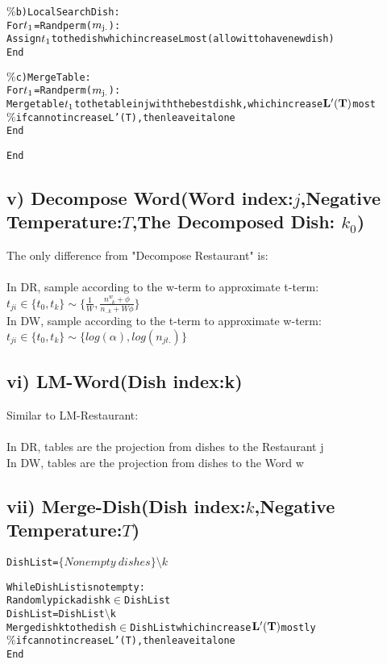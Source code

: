 \documentclass{article}
\begin{document}
\begin{spacing}{1.1}
\begin{alltt}
      \(\%\)b)Local Search Dish:
        For \(t\textsubscript{1}\)=Randperm(\(m\textsubscript{j.}\)):
            Assign \(t\textsubscript{1}\) to the dish which increase L most(allow it to have new dish)
        End
              
      \(\%\)c)Merge Table:
        For \(t\textsubscript{1}\)=Randperm(\(m\textsubscript{j.}\)):
            Merge table \(t\textsubscript{1}\) to the table in j with the best dish k, which increase \({\bf L'(T)}\) most
            \(\%\)if cannot increase L'(T),then leave it alone
        End

End
\end{alltt}
\subsection{v) Decompose Word(Word index:$j$,Negative Temperature:$T$,The Decomposed Dish: $k_{0}$)}
The only difference from "Decompose Restaurant" is:\\ \\
In DR, sample according to the w-term to approximate t-term:$t_{ji}\in\{t_{0},t_{k}\}\sim\{\frac{1}{W},\frac{n_{..k}^{w}+\phi}{n_{..k}+W\phi}\}$\\
In DW, sample according to the t-term to approximate w-term:$t_{ji}\in\{t_{0},t_{k}\}\sim\{log(\alpha),log(n_{jt.})\}$

\subsection{vi) LM-Word(Dish index:k)}
Similar to LM-Restaurant:\\\\
In DR, tables are the projection from dishes to the Restaurant j\\
In DW, tables are the projection from dishes to the Word w\\
\subsection{vii) Merge-Dish(Dish index:$k$,Negative Temperature:$T$)}
\begin{alltt}
Dish List=\(\{Nonempty \ dishes\}\setminus k\)
 
While Dish List is not empty:
    Randomly pick a dish k\(\in\) Dish List
    Dish List=Dish List\(\setminus\)k
    Merge dish k to the dish\(\in\) Dish List which increase \({\bf L'(T)}\) mostly
    \(\%\)if cannot increase L'(T), then leave it alone
 End
 
\end{alltt}

\end{spacing}
\end{document}
